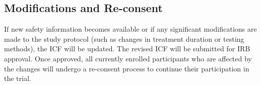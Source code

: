 \subsection{Modifications and Re-consent}
If new safety information becomes available or if any significant modifications are made to the study protocol (such as changes in treatment duration or testing methods), the ICF will be updated. The revised ICF will be submitted for IRB approval. Once approved, all currently enrolled participants who are affected by the changes will undergo a re-consent process to continue their participation in the trial.
